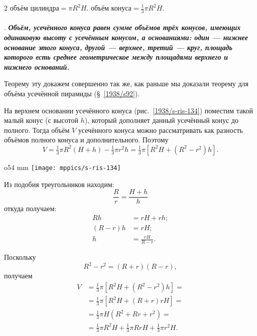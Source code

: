 \medskip

\setlength{\columnseprule}{.2pt}
\begin{paracol}{2}
$\text{объём цилиндра} = \pi R^2H$.
\switchcolumn
$\text{объём конуса} = \tfrac13\pi R^2H.$
\end{paracol}

\medskip

\paragraph{}\label{1938/s122}
.
\textbf{\emph{Объём, усечённого конуса равен сумме объёмов трёх конусов, имеющих одинаковую высоту с усечённым конусом, а основаниями: один — нижнее основание этого конуса, другой — верхнее, третий — круг, площадь которого есть среднее геометрическое между площадями верхнего и нижнего оснований.}}

Теорему эту докажем совершенно так же, как раньше мы доказали теорему для объёма усечённой пирамиды (§~\ref{1938/s92}).

На верхнем основании усечённого конуса (рис.~\ref{1938/s-ris-134}) поместим такой малый конус (с высотой $h$), который дополняет данный усечённый конус до полного.
Тогда объём $V$ усечённого конуса можно рассматривать как разность объёмов полного конуса и дополнительного.
Поэтому
\[V =\tfrac13 \pi R^2(H + h)-\tfrac13 \pi r^2h=\tfrac13 \pi [R^2H+(R^2-r^2)h].\]

\begin{wrapfigure}[10]{o}{54 mm}
\vskip-0mm
\centering
\texttt{[image: mppics/s-ris-134]}
\caption{}\label{1938/s-ris-134}
\vskip-0mm
\end{wrapfigure}

Из подобия треугольников находим:
\[\frac Rr=\frac{H+h}h\]
откуда получаем:
\begin{align*}
Rh &= rH + rh;
\\
(R-r)h &= rH;
\\
h&= \frac{rH}{R-r}.
\end{align*}

Поскольку 
\[R^2-r^2=(R+r)(R-r),\] 
получаем
\begin{align*}
V &= \tfrac13 \pi [R^2H+(R^2-r^2)h]=
\\
&= \tfrac13\pi [R^2H + (R +r)rH]=
\\
&=
\tfrac13\pi H(R^2 + Rr + r^2)
= 
\\
&=\tfrac13\pi R^2 H+\tfrac13\pi Rr H+\tfrac13\pi r^2 H.
\end{align*}

